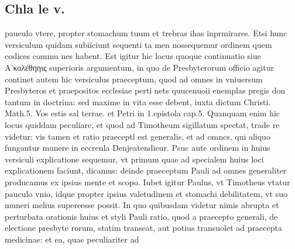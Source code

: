 \documentclass{article}
\begin{document}
\begin{pages}
\section*{Chla le v. }
\marginpar{[ p.113 ]}\pstart paueulo vtere, propter stomachum tuum et trebras ihas inprmirares.  \pend\pstart Etsi hunc versiculum quidam subiiciunt sequenti ta men nossequemur ordinem quem codices commu nes habent. Est igitur hic locus quoque continuatio siue Α’κολέθηηις superioris argumentum, in quo de Presbyterorum officio agitur continet autem hic versiculus praeceptum, quod ad omnes in vniuersum Presbyteros et praepositos ecclesiae perti nets quucenuoii enemplas pregis don tantum in doctrina: sed maxime in vita esse debent, iuxta dictum Christi. Math.5. Vos estis sal terrae. et Petri in 1.epistola cap.5.  \pend\pstart Quanquam enim hic locus quiddam peculiare, et quod ad Timotheum sigillatum spectat, trade re videtur: vis tamen et ratio praeceptl est generalis, et ad omncs, qui aliquo fungantur munere in eccrenla Denjeatendieur. Psuc aute ordinem in huius versiculi explicatione sequemur, vt primum quae ad specialem huius loci explicationem faciunt, dicamus: deinde praeceptum Pauli ad omnes generaliter producamus ex ipsius mente et scopo.  \pend\pstart Iubet igitur Paulus, vt Timotheus vtatur pauculo vnio, idque propter ipsius valetudinem et stomachi debilitatem, vt suo muneri melius supereesse possit.  \pend\pstart In quo quibusdam videtur nimis abrupta et perturbata orationis huius et styli Pauli ratio, quod a praecepto generali, de electione presbyte rorum, statim transeat, aut potius transuolet ad praecepta medicinae: et ea, quae peculiariter ad  \pend

\end{pages}
\end{document}
